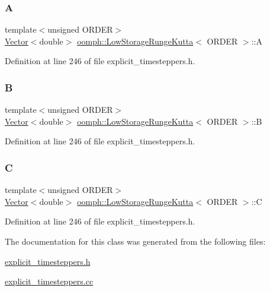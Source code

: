 \subsubsection{\texorpdfstring{A}{A}}
{\footnotesize\ttfamily template$<$unsigned O\+R\+D\+ER$>$ \\
\hyperlink{classoomph_1_1Vector}{Vector}$<$double$>$ \hyperlink{classoomph_1_1LowStorageRungeKutta}{oomph\+::\+Low\+Storage\+Runge\+Kutta}$<$ O\+R\+D\+ER $>$\+::A\hspace{0.3cm}{\ttfamily [private]}}



Definition at line 246 of file explicit\+\_\+timesteppers.\+h.

\mbox{\label{classoomph_1_1LowStorageRungeKutta_aaeae08c5f78c154a467d8e0a7fc7572b}} 
\subsubsection{\texorpdfstring{B}{B}}
{\footnotesize\ttfamily template$<$unsigned O\+R\+D\+ER$>$ \\
\hyperlink{classoomph_1_1Vector}{Vector}$<$double$>$ \hyperlink{classoomph_1_1LowStorageRungeKutta}{oomph\+::\+Low\+Storage\+Runge\+Kutta}$<$ O\+R\+D\+ER $>$\+::B\hspace{0.3cm}{\ttfamily [private]}}



Definition at line 246 of file explicit\+\_\+timesteppers.\+h.

\mbox{\label{classoomph_1_1LowStorageRungeKutta_a204b3addc6e35d2870336ff1bee7ace0}} 
\subsubsection{\texorpdfstring{C}{C}}
{\footnotesize\ttfamily template$<$unsigned O\+R\+D\+ER$>$ \\
\hyperlink{classoomph_1_1Vector}{Vector}$<$double$>$ \hyperlink{classoomph_1_1LowStorageRungeKutta}{oomph\+::\+Low\+Storage\+Runge\+Kutta}$<$ O\+R\+D\+ER $>$\+::C\hspace{0.3cm}{\ttfamily [private]}}



Definition at line 246 of file explicit\+\_\+timesteppers.\+h.



The documentation for this class was generated from the following files\+:\begin{DoxyCompactItemize}
\item 
\hyperlink{explicit__timesteppers_8h}{explicit\+\_\+timesteppers.\+h}\item 
\hyperlink{explicit__timesteppers_8cc}{explicit\+\_\+timesteppers.\+cc}\end{DoxyCompactItemize}
